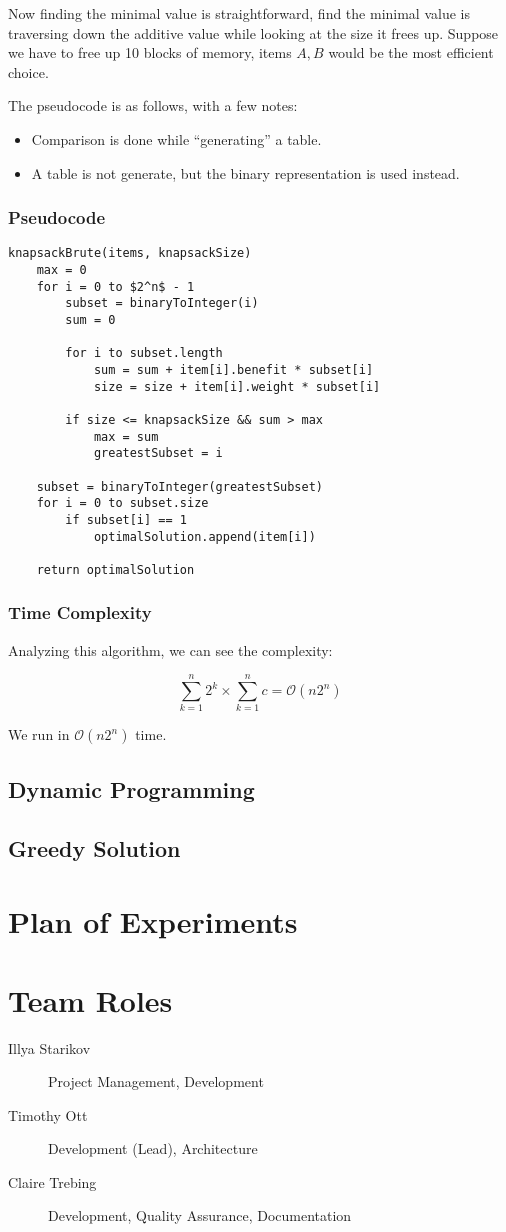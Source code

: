 \documentclass{article}
\begin{document}
Now finding the minimal value is straightforward, find the minimal value is traversing down the additive value while looking at the size it frees up. Suppose we have to free up 10 blocks of memory, items $A, B$ would be the most efficient choice.

The pseudocode is as follows, with a few notes:

\begin{itemize}
    \item Comparison is done while ``generating'' a table.
    \item A table is not generate, but the binary representation is used instead.
\end{itemize}

\subsubsection{Pseudocode}
\begin{lstlisting}[mathescape]
knapsackBrute(items, knapsackSize)
    max = 0
    for i = 0 to $2^n$ - 1
        subset = binaryToInteger(i)
        sum = 0

        for i to subset.length
            sum = sum + item[i].benefit * subset[i]
            size = size + item[i].weight * subset[i]

        if size <= knapsackSize && sum > max
            max = sum
            greatestSubset = i

    subset = binaryToInteger(greatestSubset)
    for i = 0 to subset.size
        if subset[i] == 1
            optimalSolution.append(item[i])

    return optimalSolution
\end{lstlisting}

\subsubsection{Time Complexity}
Analyzing this algorithm, we can see the complexity:

\begin{equation}
    \sum _{k = 1} ^{n} 2^k \times \sum _{k = 1} ^{n} c = \mathcal{O}(n 2^n)
\end{equation}

We run in $\mathcal{O}(n 2^n)$ time.

\subsection{Dynamic Programming}
\subsection{Greedy Solution}


\section{Plan of Experiments}


\section{Team Roles}
\begin{description}
    \item [Illya Starikov] Project Management, Development
    \item [Timothy Ott] Development (Lead), Architecture
    \item [Claire Trebing] Development, Quality Assurance,  Documentation
\end{description}
\end{document}
